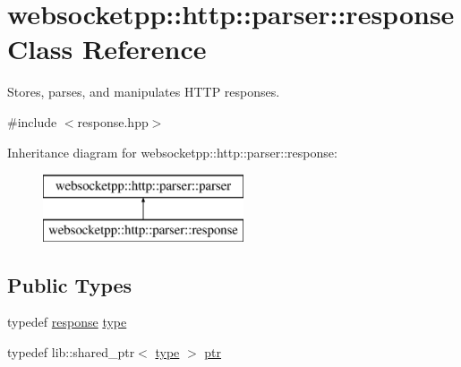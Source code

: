 \hypertarget{classwebsocketpp_1_1http_1_1parser_1_1response}{}\section{websocketpp\+:\+:http\+:\+:parser\+:\+:response Class Reference}
\label{classwebsocketpp_1_1http_1_1parser_1_1response}


Stores, parses, and manipulates H\+T\+T\+P responses.  




{\ttfamily \#include $<$response.\+hpp$>$}

Inheritance diagram for websocketpp\+:\+:http\+:\+:parser\+:\+:response\+:\begin{figure}[H]
\begin{center}
\leavevmode
\includegraphics[height=2.000000cm]{classwebsocketpp_1_1http_1_1parser_1_1response}
\end{center}
\end{figure}
\subsection*{Public Types}
\begin{DoxyCompactItemize}
\item 
typedef \hyperlink{classwebsocketpp_1_1http_1_1parser_1_1response}{response} \hyperlink{classwebsocketpp_1_1http_1_1parser_1_1response_ac8666204343c97725f35fd1aa8573c2b}{type}
\item 
typedef lib\+::shared\+\_\+ptr$<$ \hyperlink{classwebsocketpp_1_1http_1_1parser_1_1response_ac8666204343c97725f35fd1aa8573c2b}{type} $>$ \hyperlink{classwebsocketpp_1_1http_1_1parser_1_1response_a4072a02adfa5e60b4e23246d561d9c25}{ptr}
\end{DoxyCompactItemize}
